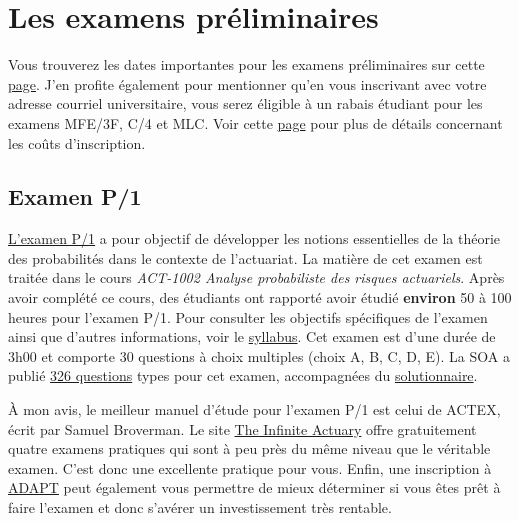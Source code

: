 \documentclass[11pt,french]{article}
\begin{document}
\newpage
\section*{Les examens préliminaires}
\label{sec:prelims}
Vous trouverez les dates importantes pour les examens préliminaires sur cette \href{https://www.soa.org/Education/Exam-Req/Exam-Day-Info/edu-2017-cbt-test-schedule.aspx}{page}. J'en profite également pour mentionner qu'en vous inscrivant avec votre adresse courriel universitaire, vous serez éligible à un rabais étudiant pour les examens MFE/3F, C/4 et MLC. Voir cette \href{https://soa.org/Education/Exam-Req/Syllabus-Study-Materials/Exam-and-Module-Fees.aspx}{page} pour plus de détails concernant les coûts d'inscription.


\subsection*{Examen P/1}
\label{subsec:examp}
\href{https://www.soa.org/education/exam-req/edu-exam-p-detail.aspx}{L'examen P/1} a pour objectif de développer les notions essentielles de la théorie des probabilités dans le contexte de l'actuariat. La matière de cet examen est traitée dans le cours \textit{ACT-1002 Analyse probabiliste des risques actuariels}. Après avoir complété ce cours, des étudiants ont rapporté avoir étudié \textbf{environ} 50 à 100 heures pour l'examen P/1. Pour consulter les objectifs spécifiques de l'examen ainsi que d'autres informations, voir le \href{https://www.soa.org/Files/Edu/2017/edu-2017-01-p-syllabus.pdf}{syllabus}. Cet examen est d'une durée de 3h00 et comporte 30 questions à choix multiples (choix A, B, C, D, E). La SOA a publié \href{http://www.soa.org/Files/Edu/edu-exam-p-sample-quest.pdf}{326 questions} types pour cet examen, accompagnées du \href{http://www.soa.org/Files/Edu/edu-exam-p-sample-sol.pdf}{solutionnaire}.\vspace{\baselineskip}

À mon avis, le meilleur manuel d'étude pour l'examen P/1 est celui de ACTEX, écrit par Samuel Broverman. Le site \href{http://www.theinfiniteactuary.com/exams/1}{The Infinite Actuary} offre gratuitement quatre examens pratiques qui sont à peu près du même niveau que le véritable examen. C'est donc une excellente pratique pour vous. Enfin, une inscription à \href{https://www.coachingactuaries.com/}{ADAPT} peut également vous permettre de mieux déterminer si vous êtes prêt à faire l'examen et donc s'avérer un investissement très rentable.\vspace{\baselineskip}
\end{document}
